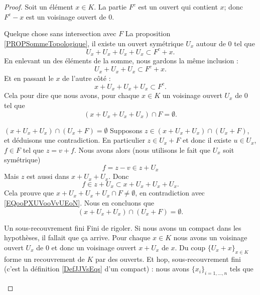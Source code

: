 \begin{proof}
    Soit un élément \( x\in K\). La partie \( F^c\) est un ouvert qui contient \( x\); donc \( F^c-x\) est un voisinage ouvert de \( 0\).

    \begin{subproof}
    \item[Quelque chose sans intersection avec \( F\)]
        La proposition \ref{PROPSommeTopologique}, il existe un ouvert symétrique \( U_x\) autour de \( 0\) tel que
        \begin{equation}
            U_x+U_x+U_x+U_x\subset F^c+x.
        \end{equation}
        En enlevant un des éléments de la somme, nous gardons la même inclusion :
        \begin{equation}
            U_x+U_x+U_x\subset F^c+x.
        \end{equation}
        Et en passant le \( x\) de l'autre côté :
        \begin{equation}
            x+U_x+U_x+U_x\subset F^c.
        \end{equation}
        Cela pour dire que nous avons, pour chaque \( x\in K\) un voisinage ouvert \( U_x\) de \( 0\) tel que
        \begin{equation}        \label{EQooPXUVooVvUEoN}
            (x+U_x+U_x+U_x)\cap F=\emptyset.
        \end{equation}
    \item[\( (x+U_x+U_x)\cap (U_x+F)=\emptyset\)]
        Supposons \( z\in (x+U_x+U_x)\cap (U_x+F)\), et déduisons une contradiction. En particulier \( z\in U_x+F\) et donc il existe \( u\in U_x\), \( f\in F\) tel que \( z=v+f\). Nous avons alors (nous utilisons le fait que \( U_x\) soit symétrique)
        \begin{equation}
            f=z-v\in z+U_x
        \end{equation}
        Mais \( z\) est aussi dans \( x+U_x+U_x\). Donc
        \begin{equation}
            f\in z+U_x\subset x+U_x+U_x+U_x.
        \end{equation}
        Cela prouve que \( x+U_x+U_x+U_x\cap F\neq \emptyset\), en contradiction avec \eqref{EQooPXUVooVvUEoN}. Nous en concluons que
        \begin{equation}        \label{EQooNLCRooWTEoye}
            (x+U_x+U_x)\cap (U_x+F)=\emptyset.
        \end{equation}
    \item[Un sous-recouvrement fini]
        Fini de rigoler. Si nous avons un compact dans les hypothèses, il fallait que ça arrive. Pour chaque \( x\in K\) nous avons un voisinage ouvert \( U_x\) de \( 0\) et donc un voisinage ouvert \( x+U_x\) de \( x\). Du coup \( \{ U_x+x \}_{x\in K}\) forme un recouvrement de \( K\) par des ouverts. Et hop, sous-recouvrement fini (c'est la définition \ref{DefJJVsEqs} d'un compact) : nous avons \( \{ x_i \}_{i=1,\ldots, n}\) tels que

\end{subproof}
\end{proof}
